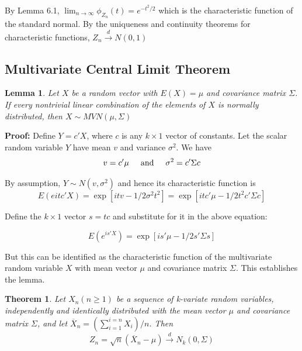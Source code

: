 \documentclass{article}
\newtheorem{theorem}{Theorem}[section]
\newtheorem{lemma}{Lemma}[section]
\begin{document}
By Lemma 6.1, \(\lim_{n \rightarrow \infty} \phi_{Z_n}(t)=e^{-t^2/2}\) which is the characteristic function of the standard normal. By the uniqueness and continuity theorems for characteristic functions, \(Z_n \stackrel{d} \longrightarrow N(0,1)\)

\subsection{Multivariate Central Limit Theorem}

\begin{lemma}
    Let $X$ be a random vector with \(E(X)=\mu\) and covariance matrix \(\Sigma\). If every nontrivial linear combination of the elements of $X$ is normally distributed, then \(X\sim MVN(\mu,\Sigma)\)
\end{lemma}

\textbf{Proof:} Define \(Y=c'X\), where $c$ is any \(k \times 1\) vector of constants. Let the scalar random variable $Y$ have mean $v$ and variance $\sigma^2$. We have
\begin{equation*}
    v=c'\mu \hspace{0.5cm} \text{and} \hspace{0.5cm} \sigma^2=c'\Sigma c
\end{equation*}

By assumption, \(Y \sim N(v,\sigma^2)\) and hence its characteristic function is
\begin{equation*}
    E(e{itc'X})=\exp[itv-1/2 \sigma^2t^2]=\exp[itc'\mu-1/2t^2c'\Sigma c]
\end{equation*}

Define the \(k \times 1\) vector \(s=tc\) and substitute for it in the above equation:

\begin{equation*}
    E(e^{is'X})=\exp[is'\mu-1/2s' \Sigma s]
\end{equation*}

But this can be identified as the characteristic function of the multivariate random variable $X$ with mean vector $\mu$ and covariance matrix $\Sigma$. This establishes the lemma.

\begin{theorem}
Let \(X_n (n \geq 1)\) be a sequence of k-variate random variables, independently and identically distributed with the mean vector $\mu$ and covariance matrix $\Sigma$, and let \(\overline{X}_n=(\sum_{i=1}^{i=n}X_i)/n\). Then
\begin{equation*}
    Z_n=\sqrt{n}(\overline{X}_n-\mu) \stackrel{d} \longrightarrow N_k(0,\Sigma)
\end{equation*}
\end{theorem}
\end{document}
